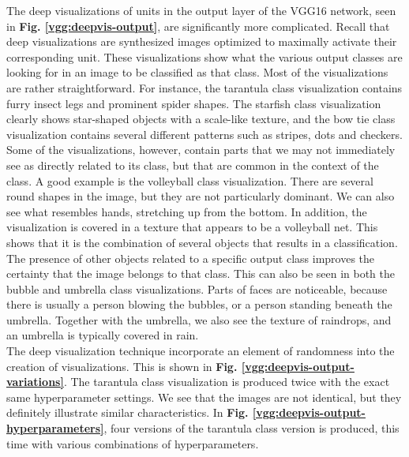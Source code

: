 \noindent The deep visualizations of units in the output layer of the VGG16 network, seen in \textbf{Fig. \ref{vgg:deepvis-output}}, are significantly more complicated. Recall that deep visualizations are synthesized images optimized to maximally activate their corresponding unit. These visualizations show what the various output classes are looking for in an image to be classified as that class. Most of the visualizations are rather straightforward. For instance, the tarantula class visualization contains furry insect legs and prominent spider shapes. The starfish class visualization clearly shows star-shaped objects with a scale-like texture, and the bow tie class visualization contains several different patterns such as stripes, dots and checkers. Some of the visualizations, however, contain parts that we may not immediately see as directly related to its class, but that are common in the context of the class. A good example is the volleyball class visualization. There are several round shapes in the image, but they are not particularly dominant. We can also see what resembles hands, stretching up from the bottom. In addition, the visualization is covered in a texture that appears to be a volleyball net. This shows that it is the combination of several objects that results in a classification. The presence of other objects related to a specific output class improves the certainty that the image belongs to that class. This can also be seen in both the bubble and umbrella class visualizations. Parts of faces are noticeable, because there is usually a person blowing the bubbles, or a person standing beneath the umbrella. Together with the umbrella, we also see the texture of raindrops, and an umbrella is typically covered in rain. \\

\noindent The deep visualization technique incorporate an element of randomness into the creation of visualizations. This is shown in \textbf{Fig. \ref{vgg:deepvis-output-variations}}. The tarantula class visualization is produced twice with the exact same hyperparameter settings. We see that the images are not identical, but they definitely illustrate similar characteristics. In \textbf{Fig. \ref{vgg:deepvis-output-hyperparameters}}, four versions of the tarantula class version is produced, this time with various combinations of hyperparameters. \\ %


